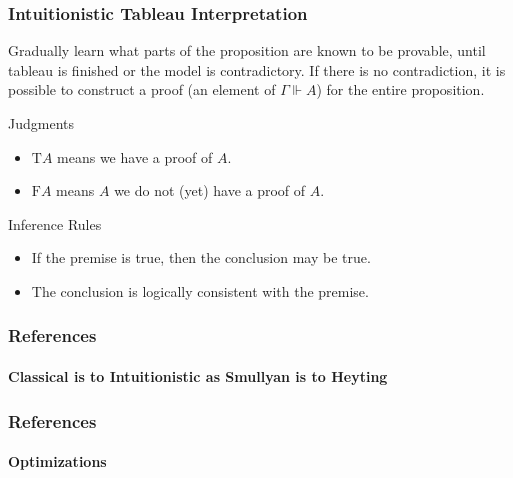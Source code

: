 \documentclass[mathserif]{beamer}
\def\T{\textrm{T}}
\def\F{\textrm{F}}
\newcommand{\diff}[1]{{\color{red} #1}}
\newcommand{\force}[1]{\Gamma \Vdash #1}
\begin{document}
\begin{frame}
\frametitle{Intuitionistic Tableau Interpretation}

Gradually learn what parts of the proposition are known to be provable,
until tableau is finished or the model is contradictory.
If there is no contradiction, it is possible to construct a proof
(an element of $\force{A}$) for the entire proposition.

\begin{block}{Judgments}
\begin{itemize}
\item $\T A$ means we have a proof of $A$.
\item $\F A$ means $A$ we do not (yet) have a proof of $A$.
\end{itemize}
\end{block}

\begin{block}{Inference Rules}
\begin{itemize}
\item If the premise is true, then the conclusion \diff{may} be true.
\item The conclusion is logically consistent with the premise.
\end{itemize}
\end{block}

\end{frame}


\begin{frame}
\frametitle{References}
\framesubtitle{Classical is to Intuitionistic as Smullyan is to Heyting}

\end{frame}

\begin{frame}
\frametitle{References}
\framesubtitle{Optimizations}

\end{frame}
\end{document}
